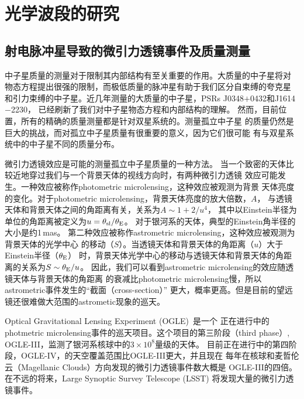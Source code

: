 
\chapter{光学波段的研究}

\section{射电脉冲星导致的微引力透镜事件及质量测量}

中子星质量的测量对于限制其内部结构有至关重要的作用。大质量的中子星将对
物态方程提出很强的限制，而极低质量的脉冲星有助于我们区分自束缚的夸克星
和引力束缚的中子星。近几年测量的大质量的中子星，PSRs J0348$+$0432和J1614$-$2230，
已经刷新了我们对中子星物态方程和内部结构的理解\supercite{Anton,Demorest,Ozel2010,Lai2011}。
%
然而，目前位置，所有的精确的质量测量都是针对双星系统的。测量孤立中子星
的质量仍然是巨大的挑战，而对孤立中子星质量有很重要的意义，因为它们很可能
有与双星系统中的中子星不同的质量分布。

微引力透镜效应是可能的测量孤立中子星质量的一种方法\supercite{Dai,Schwarz02,Horvath96}。
当一个致密的天体比较近地穿过我们与一个背景天体的视线方向时，有两种微引力透镜
效应可能发生。一种效应被称作photometric microlensing，这种效应被观测为背景
天体亮度的变化。对于photometric microlensing，背景天体亮度的放大倍数，$A$，
与透镜天体和背景天体之间的角距离有关，关系为$A\sim 1+2/u^{4}$\supercite{mao}，
其中以Einstein半径为单位的角距离被定义为$u=\theta_{\rm{sl}}/\theta_{\rm{E}}$。
对于银河系的天体，典型的Einstein角半径的大小是约1\,mas。
%
第二种效应被称作astrometric microlensing，这种效应被观测为背景天体的光学中心
的移动（$S$）。当透镜天体和背景天体的角距离（$u$）大于Einstein半径（$\theta_{\rm{E}}$）
时，背景天体光学中心的移动与透镜天体和背景天体的角距离的关系为$S \sim \theta_{\rm{E}}/u$\supercite{Bel}。
因此，我们可以看到astrometric microlensing的效应随透镜天体与背景天体的角距离
的衰减比photometric microlensing慢，所以astrometric事件发生的“截面（cross-section）”
更大，概率更高。但是目前的望远镜还很难做大范围的astrometic现象的巡天。

Optical Gravitational Lensing Experiment (OGLE)~\supercite{Udalski}是一个
正在进行中的photmetric microlensing事件的巡天项目。这个项目的第三阶段（third phase）,
OGLE-III，监测了银河系核球中的$3\times10^{8}$量级的天体\supercite{Szymanski}。
目前正在进行中的第四阶段，OGLE-IV，的天空覆盖范围比OGLE-III更大，并且现在
每年在核球和麦哲伦云（Magellanic Clouds）方向发现的微引力透镜事件数大概是
OGLE-III的四倍。在不远的将来，Large Synoptic Survey Telescope (LSST)\supercite{lsst}
将发现大量的微引力透镜事件。

